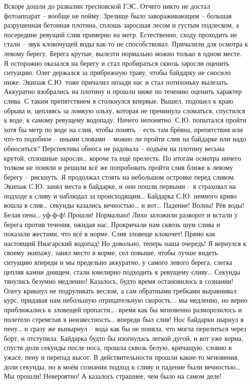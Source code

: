 Вскоре дошли до развалин тресновской ГЭС. Отчего никто не достал фотоаппарат – вообще не пойму. Зрелище было завораживающим – большая разрушенная бетонная плотина, сплошь заросшая лесом и густым подлеском, а посередине ревущий слив примерно на метр. Естественно, сходу проходить не стали – звук клокочущей воды как-то не способствовал. Причалили для осмотра к левому берегу. Берега крутые, вылезти нормально можно только в одном месте. Я осторожно оказался на берегу и стал пробираться сквозь заросли оценить ситуацию. Олег держался за прибрежную траву, чтобы байдарку не сносило ниже. Экипаж С.Ю. тоже причалил позади нас и стал потихоньку вылезать. Аккуратно взобрались на плотину и прошли ниже по течению оценить характер слива. С таким препятствием я столкнулся впервые. Вышел, подошел к краю обрыва и, цепляясь за ломкую ольху, которая не преминула сломаться, спустился к воде, к самому ревущему водопаду. Ничего непонятно. С.Ю. попытался пройти хотя бы метр по воде на слив, чтобы понять – есть там брёвна, препятствия или что-то подобное – иными словами – можно ли пройти слив на байдарке или надо обноситься? Перспектива обноса не радовала – подъём на плотину весьма крутой, сплошные заросли… короче та ещё прелесть. По итогам осмотра ничего толком не поняли и решили всё же попробовать пройти слив ближе к левому берегу – рискнуть. Я продолжал стоять на небольшом островке перед сливом. Экипаж С.Ю. занял места в байдарке, и они пошли первыми – я страховал на подходе к сливу и наблюдал за происходящим…
Байдарка С.Ю. немного криво вошла в слив… секунды казались вечностью… и вот… Падение! Волны! Рёв воды! Белая пена… уф-ф-ф! Прошли! Нормально! Лихо заложили разворот и встали у берега против течения, ожидая нас. Прокричали нам сквозь шум слива и показали жестами, что всё в норме. Слив зловеще клокочет! Прямо как настоящий Ниагарский водопад! Но довольно, теперь наша очередь! Я вернулся к своему экипажу, занял место в корме, сел повыше, чтобы лучше видеть ситуацию впереди и мы предельно аккуратно, у самого левого берега, слегка цепляя камни днищем, стали ювелирно подходить к ревущему сливу… 
Секунды тянулись безумно медленно! Казалось, будто время остановилось в сознании! Олегу крикнул не подруливать веслом, а сам обратными гребками выравнивал курс, придавая нам небольшую отрицательную скорость... мы медленно, но верно приближались к зловещей пропасти…. время как бы мгновенно разморозилось и полетело стремглав в неизвестность… впереди был слив! Нос байдарки нырнул в пену… и сразу же вынырнул – вода как бы не поняла, что могла перелиться через борт, и отступила. Байдарка будто бы изогнулась легкой дугой, и вот уже корма, спустя доли секунды после носа, прошла сквозь белую, кричащую, словно в ужасе, пену и перепад высот. В действительности прошли какие-то мгновения, доли секунды, но в моём сознании подход к сливу и падение были вечностью… Мы прошли! Невероятно! А казалось страшнее, чем было на самом деле!  
